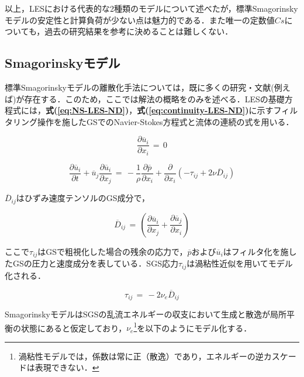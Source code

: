 以上，LESにおける代表的な2種類のモデルについて述べたが，標準Smagorinskyモデルの安定性と計算負荷が少ない点は魅力的である．また唯一の定数値$Cs$についても，過去の研究結果を参考に決めることは難しくない．

%
\subsection{Smagorinskyモデル}
標準Smagorinskyモデルの離散化手法については，既に多くの研究・文献(例えば\cite{inagaki:03:JSFM,germano:91:PF})が存在する．このため，ここでは解法の概略をのみを述べる．LESの基礎方程式には，\textbf{式(\ref{eq:NS-LES-ND})}，\textbf{式(\ref{eq:continuity-LES-ND})}に示すフィルタリング操作を施したGSでのNavier-Stokes方程式と流体の連続の式を用いる\cite{kajishima:99:simulation,JSME:06:Handbook}．

\begin{equation}
\frac{\partial \overline{u}_i}{\partial x_i} \,=\, 0
\label{eq:continuity-LES-ND}
\end{equation}

\begin{equation}
\frac{\partial \overline{u}_i}{\partial t} + \overline{u}_j \frac{\partial \overline{u}_i}{\partial x_j}
\,=\,
- \frac{1}{\rho} \frac{\partial \overline{p}}{\partial x_i}
+ \frac{\partial}{\partial x_i} \left(
- \tau_{ij} + 2 \nu \overline{D}_{ij} \right)
\label{eq:NS-LES-ND}
\end{equation}

\noindent $\overline{D}_{ij}$はひずみ速度テンソルのGS成分で，

\begin{equation}
\overline{D}_{ij} \,=\, \left( {
\frac{\partial \overline{u}_i}{\partial x_j} + \frac{\partial \overline{u}_j}{\partial x_i}
} \right)
\label{eq:LES-SGS-tensor}
\end{equation}

\noindent ここで$\tau_{ij}$はGSで粗視化した場合の残余の応力で，$\overline{p}$および$\overline{u}_i$はフィルタ化を施したGSの圧力と速度成分を表している．SGS応力$\tau_{ij}$は渦粘性近似を用いてモデル化される．

\begin{equation}
\tau_{ij} \,=\, -2 \nu_e \overline{D}_{ij}
\label{eq:LES-SGS}
\end{equation}

\noindent SmagorinskyモデルはSGSの乱流エネルギーの収支において生成と散逸が局所平衡の状態にあると仮定しており，$\nu_e$\footnote{渦粘性モデルでは，係数は常に正（散逸）であり，エネルギーの逆カスケードは表現できない．}を以下のようにモデル化する．

